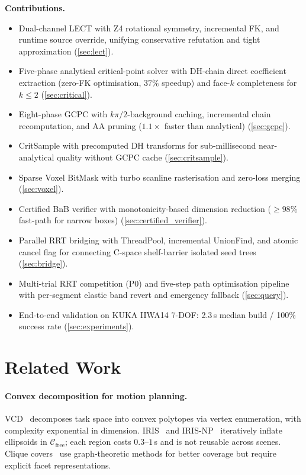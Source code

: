 \documentclass[journal]{IEEEtran}
\newcommand{\Cfree}{\mathcal{C}_\text{free}}
\begin{document}
\textbf{Contributions.}
\begin{itemize}[nosep]
  \item Dual-channel LECT with Z4 rotational symmetry, incremental FK,
    and runtime source override, unifying conservative refutation and
    tight approximation (\cref{sec:lect}).
  \item Five-phase analytical critical-point solver with DH-chain
    direct coefficient extraction (zero-FK optimisation, $37\%$ speedup)
    and face-$k$ completeness for $k \leq 2$ (\cref{sec:critical}).
  \item Eight-phase GCPC with $k\pi/2$-background caching, incremental
    chain recomputation, and AA pruning ($1.1{\times}$ faster than
    analytical) (\cref{sec:gcpc}).
  \item CritSample with precomputed DH transforms for sub-millisecond
    near-analytical quality without GCPC cache (\cref{sec:critsample}).
  \item Sparse Voxel BitMask with turbo scanline rasterisation and
    zero-loss merging (\cref{sec:voxel}).
  \item Certified BnB verifier with monotonicity-based dimension
    reduction ($\geq 98\%$ fast-path for narrow boxes) (\cref{sec:certified_verifier}).
  \item Parallel RRT bridging with ThreadPool, incremental UnionFind,
    and atomic cancel flag for connecting C-space shelf-barrier
    isolated seed trees (\cref{sec:bridge}).
  \item Multi-trial RRT competition (P0) and five-step path
    optimisation pipeline with per-segment elastic band revert and
    emergency fallback (\cref{sec:query}).
  \item End-to-end validation on KUKA IIWA14 7-DOF: 2.3\,s median build /
    100\% success rate (\cref{sec:experiments}).
\end{itemize}

\section{Related Work}\label{sec:related}

\paragraph{Convex decomposition for motion planning.}
VCD~\cite{werner2024vcd} decomposes task space into convex polytopes
via vertex enumeration, with complexity exponential in dimension.
IRIS~\cite{deits2015computing} and IRIS-NP~\cite{werner2024fast}
iteratively inflate ellipsoids in $\Cfree$; each region costs
$0.3$--$1$\,s and is not reusable across scenes.
Clique covers~\cite{amice2024clique} use graph-theoretic methods
for better coverage but require explicit facet representations.
\end{document}
